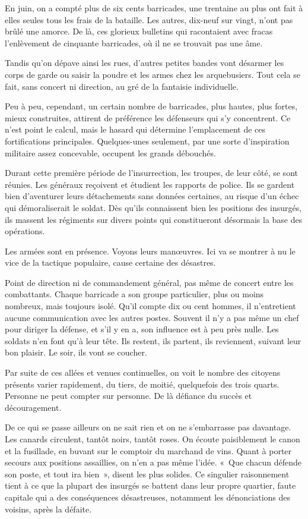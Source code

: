 \documentclass[french,twoside]{book} %
\begin{document}
En juin, on a compté plus de six cents barricades, une trentaine au plus ont fait à elles seules tous les frais de la bataille. Les autres, dix-neuf sur vingt, n’ont pas brûlé une amorce. De là, ces glorieux bulletins qui racontaient avec fracas l’enlèvement de cinquante barricades, où il ne se trouvait pas une âme.\par
Tandis qu’on dépave ainsi les rues, d’autres petites bandes vont désarmer les corps de garde ou saisir la poudre et les armes chez les arquebusiers. Tout cela se fait, sans concert ni direction, au gré de la fantaisie individuelle.\par
Peu à peu, cependant, un certain nombre de barricades, plus hautes, plus fortes, mieux construites, attirent de préférence les défenseurs qui s’y concentrent. Ce n’est point le calcul, mais le hasard qui détermine l’emplacement de ces fortifications principales. Quelques-unes seulement, par une sorte d’inspiration militaire assez concevable, occupent les grands débouchés.\par
Durant cette première période de l’insurrection, les troupes, de leur côté, se sont réunies. Les généraux reçoivent et étudient les rapports de police. Ils se gardent bien d’aventurer leurs détachements sans données certaines, au risque d’un échec qui démoraliserait le soldat. Dès qu’ils connaissent bien les positions des insurgés, ils massent les régiments sur divers points qui constitueront désormais la base des opérations.\par
Les armées sont en présence. Voyons leurs manœuvres. Ici va se montrer à nu le vice de la tactique populaire, cause certaine des désastres.\par
Point de direction ni de commandement général, pas même de concert entre les combattants. Chaque barricade a son groupe particulier, plus ou moins nombreux, mais toujours isolé. Qu'il compte dix ou cent hommes, il n’entretient aucune communication avec les autres postes. Souvent il n’y a pas même un chef pour diriger la défense, et s’il y en a, son influence est à peu près nulle. Les soldats n’en font qu’à leur tête. Ils restent, ils partent, ils reviennent, suivant leur bon plaisir. Le soir, ils vont se coucher.\par
Par suite de ces allées et venues continuelles, on voit le nombre des citoyens présents varier rapidement, du tiers, de moitié, quelquefois des trois quarts. Personne ne peut compter sur personne. De là défiance du succès et découragement.\par
De ce qui se passe ailleurs on ne sait rien et on ne s’embarrasse pas davantage. Les canards circulent, tantôt noirs, tantôt roses. On écoute paisiblement le canon et la fusillade, en buvant sur le comptoir du marchand de vins. Quant à porter secours aux positions assaillies, on n’en a pas même l’idée. « Que chacun défende son poste, et tout ira bien », disent les plus solides. Ce singulier raisonnement tient à ce que la plupart des insurgés se battent dans leur propre quartier, faute capitale qui a des conséquences désastreuses, notamment les dénonciations des voisins, après la défaite.\par
\end{document}

